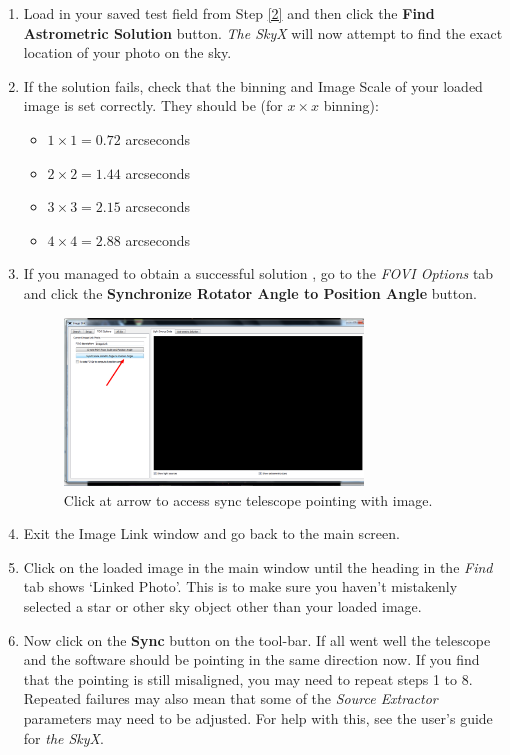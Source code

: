 \documentclass[12pt,twoside,a4paper]{report}
\begin{document}
\begin{enumerate}
 \item Load in your saved test field from Step \ref{2} and then click the \textbf{Find Astrometric Solution} button. \emph{The SkyX} will now attempt to find the exact location of your photo on the sky. 

 \item If the solution fails, check that the binning and Image Scale of your loaded image is set correctly. They should be (for $x \times x$ binning):

 \begin{itemize}
  \item $1\times1 = 0.72$ arcseconds
  \item $2\times2 = 1.44$ arcseconds
  \item $3\times3 = 2.15$ arcseconds
  \item $4\times4 = 2.88$ arcseconds 
 \end{itemize}

 \item If you managed to obtain a successful solution , go to the \emph{FOVI Options} tab and click the \textbf{Synchronize Rotator Angle to Position Angle} button.

  \begin{figure}[ht]
 \centering
    \includegraphics[width=0.75\textwidth]{documentation_images/pointing2_1.png}
    \caption{\label{fig:pointing1}Click at arrow to access sync telescope pointing with image.}
  \end{figure}

 \item Exit the Image Link window and go back to the main screen.

 \item Click on the loaded image in the main window until the heading in the \emph{Find} tab shows `Linked Photo'. This is to make sure you haven't mistakenly selected a star or other sky object other than your loaded image.

 \item Now click on the \textbf{Sync} button on the tool-bar. If all went well the telescope and the software should be pointing in the same direction now. If you find that the pointing is still misaligned, you may need to repeat steps 1 to 8. Repeated failures may also mean that some of the \emph{Source Extractor} parameters may need to be adjusted. For help with this, see the user's guide for \emph{the SkyX}.
\end{enumerate}
\end{document}
